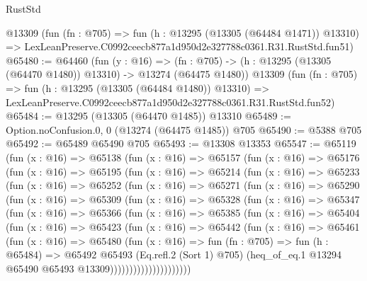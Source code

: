 \begin{lexlean}{RustStd}
\begin{coremodule}
    @13309
    (fun (fn : @705) =>
    fun (h : @13295 (@13305 (@64484 @1471)) @13310) =>
    LexLeanPreserve.C0992ceecb877a1d950d2e327788c0361.R31.RustStd.fun51)
@65480 := @64460
    (fun (y : @16) =>
    (fn : @705) -> (h : @13295 (@13305 (@64470 @1480)) @13310) -> @13274 (@64475 @1480))
    @13309
    (fun (fn : @705) =>
    fun (h : @13295 (@13305 (@64484 @1480)) @13310) =>
    LexLeanPreserve.C0992ceecb877a1d950d2e327788c0361.R31.RustStd.fun52)
@65484 := @13295 (@13305 (@64470 @1485)) @13310
@65489 := Option.noConfusion.{0, 0} (@13274 (@64475 @1485)) @705
@65490 := @5388 @705
@65492 := @65489 @65490 @705
@65493 := @13308 @13353
@65547 := @65119
    (fun (x : @16) =>
    @65138
      (fun (x : @16) =>
      @65157
        (fun (x : @16) =>
        @65176
          (fun (x : @16) =>
          @65195
            (fun (x : @16) =>
            @65214
              (fun (x : @16) =>
              @65233
                (fun (x : @16) =>
                @65252
                  (fun (x : @16) =>
                  @65271
                    (fun (x : @16) =>
                    @65290
                      (fun (x : @16) =>
                      @65309
                        (fun (x : @16) =>
                        @65328
                          (fun (x : @16) =>
                          @65347
                            (fun (x : @16) =>
                            @65366
                              (fun (x : @16) =>
                              @65385
                                (fun (x : @16) =>
                                @65404
                                  (fun (x : @16) =>
                                  @65423
                                    (fun (x : @16) =>
                                    @65442
                                      (fun (x : @16) =>
                                      @65461
                                        (fun (x : @16) =>
                                        @65480
                                          (fun (x : @16) =>
                                          fun (fn : @705) =>
                                          fun (h : @65484) =>
                                          @65492
                                            @65493
                                            (Eq.refl.{2} (Sort 1) @705)
                                            (heq_of_eq.{1}
                                              @13294
                                              @65490
                                              @65493
                                              @13309)))))))))))))))))))))

\end{coremodule}
\end{lexlean}
